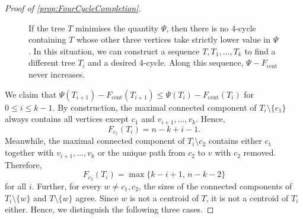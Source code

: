 \documentclass[reqno,dvipsnames]{amsart}
\theoremstyle{plain}
\numberwithin{equation}{section}
\theoremstyle{definition}
\begin{document}
\begin{proof} [Proof of \autoref{prop:FourCycleCompletion}]
\begin{figure}[tbp]
				\vspace{-3mm}
				\caption{If the tree $T$ minimises the quantity $\Psi$, then there is no 4-cycle containing $T$ whose other three vertices take strictly lower value in $\Psi$. In this situation, we can construct a sequence $T,T_1,\ldots, T_k$ to find a different tree $T_i$ and a desired 4-cycle. Along this sequence, $\Psi - F_\mathrm{cent}$ never increases.}
				\label{fig:FourCycleCompletion}
			\end{figure}
			
			We claim that $\Psi(T_{i+1}) - F_\mathrm{cent} (T_{i+1}) \leq \Psi(T_i) - F_\mathrm{cent} (T_i)$ for $0\leq i \leq k-1$. By construction, the maximal connected component of $T_i\setminus \{c_1\}$ always contains all vertices except $c_1$ and $v_{i+1},\ldots, v_k$. Hence,
			\[
				F_{c_1} (T_i) = n-k+i-1.
			\]
			Meanwhile, the maximal connected component of $T_i\setminus c_2$ contains either $c_1$ together with $v_{i+1},\ldots, v_k$ or the unique path from $c_2$ to $v$ with $c_2$ removed. Therefore, 
			\[
				F_{c_2} (T_i) = \max \{ k-i+1, \, n-k-2 \}
			\]
			for all $i$. Further, for every $w \neq c_1,c_2$, the sizes of the connected components of $T_i\setminus \{w\}$ and $T\setminus \{w\}$ agree. Since $w$ is not a centroid of $T$, it is not a centroid of $T_i$ either. Hence, we distinguish the following three cases.


\end{proof}
\end{document}

